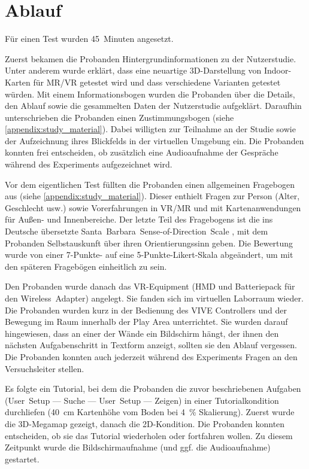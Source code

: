 \section{Ablauf}
Für einen Test wurden \num{45}~Minuten angesetzt.

Zuerst bekamen die Probanden Hintergrundinformationen zu der Nutzerstudie.
Unter anderem wurde erklärt, dass eine neuartige 3D-Darstellung von Indoor-Karten für MR/VR getestet wird und dass verschiedene Varianten getestet würden.
Mit einem Informationsbogen wurden die Probanden über die Details, den Ablauf sowie die gesammelten Daten der Nutzerstudie aufgeklärt.
Daraufhin unterschrieben die Probanden einen Zustimmungsbogen (siehe \autoref{appendix:study_material}).
Dabei willigten zur Teilnahme an der Studie sowie der Aufzeichnung ihres Blickfelds in der virtuellen Umgebung ein.
Die Probanden konnten frei entscheiden, ob zusätzlich eine Audioaufnahme der Gespräche während des Experiments aufgezeichnet wird.

Vor dem eigentlichen Test füllten die Probanden einen allgemeinen Fragebogen aus (siehe \autoref{appendix:study_material}).
Dieser enthielt Fragen zur Person (Alter, Geschlecht usw.) sowie Vorerfahrungen in VR/MR und mit Kartenanwendungen für Außen- und Innenbereiche. Der letzte Teil des Fragebogens ist die ins Deutsche übersetzte Santa~Barbara~Sense-of-Direction~Scale \parencite{Hegarty2002}, mit dem Probanden Selbstauskunft über ihren Orientierungssinn geben.
Die Bewertung wurde von einer 7-Punkte- auf eine 5-Punkte-Likert-Skala abgeändert, um mit den späteren Fragebögen einheitlich zu sein.

Den Probanden wurde danach das VR-Equipment (HMD und Batteriepack für den Wireless~Adapter) angelegt.
Sie fanden sich im virtuellen Laborraum wieder.
Die Probanden wurden kurz in der Bedienung des VIVE Controllers und der Bewegung im Raum innerhalb der Play Area unterrichtet.
Sie wurden darauf hingewiesen, dass an einer der Wände ein Bildschirm hängt, der ihnen den nächsten Aufgabenschritt in Textform anzeigt, sollten sie den Ablauf vergessen.
Die Probanden konnten auch jederzeit während des Experiments Fragen an den Versuchsleiter stellen.

Es folgte ein Tutorial, bei dem die Probanden die zuvor beschriebenen Aufgaben (User~Setup --- Suche --- User~Setup --- Zeigen) in einer Tutorialkondition durchliefen (\SI{40}{\cm} Kartenhöhe vom Boden bei \SI{4}{\percent} Skalierung).
Zuerst wurde die 3D-Megamap gezeigt, danach die 2D-Kondition.
Die Probanden konnten entscheiden, ob sie das Tutorial wiederholen oder fortfahren wollen.
Zu diesem Zeitpunkt wurde die Bildschirmaufnahme (und ggf. die Audioaufnahme) gestartet.

